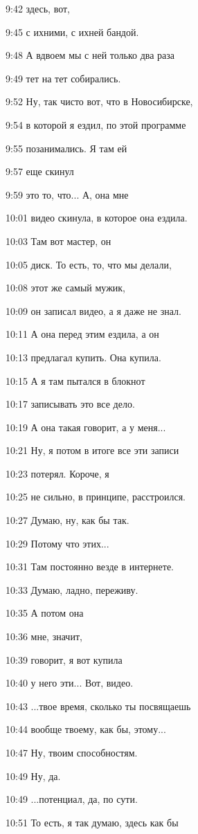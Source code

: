 9:42
здесь, вот,

9:45
с ихними, с ихней бандой.

9:48
А вдвоем мы с ней только два раза

9:49
тет на тет собирались.

9:52
Ну, так чисто вот, что в Новосибирске,

9:54
в которой я ездил, по этой программе

9:55
позанимались. Я там ей

9:57
еще скинул

9:59
это то, что... А, она мне

10:01
видео скинула, в которое она ездила.

10:03
Там вот мастер, он

10:05
диск. То есть, то, что мы делали,

10:08
этот же самый мужик,

10:09
он записал видео, а я даже не знал.

10:11
А она перед этим ездила, а он

10:13
предлагал купить. Она купила.

10:15
А я там пытался в блокнот

10:17
записывать это все дело.

10:19
А она такая говорит, а у меня...

10:21
Ну, я потом в итоге все эти записи

10:23
потерял. Короче, я

10:25
не сильно, в принципе, расстроился.

10:27
Думаю, ну, как бы так.

10:29
Потому что этих...

10:31
Там постоянно везде в интернете.

10:33
Думаю, ладно, переживу.

10:35
А потом она

10:36
мне, значит,

10:39
говорит, я вот купила

10:40
у него эти... Вот, видео.

10:43
...твое время, сколько ты посвящаешь

10:44
вообще твоему, как бы, этому...

10:47
Ну, твоим способностям.

10:49
Ну, да.

10:49
...потенциал, да, по сути.

10:51
То есть, я так думаю, здесь как бы

